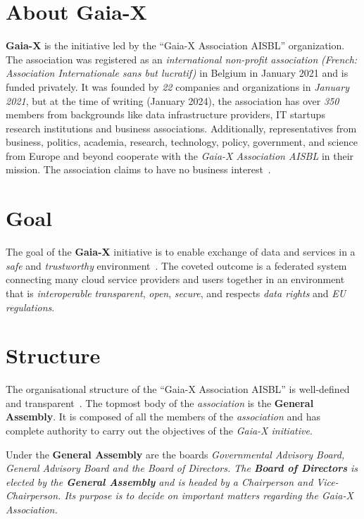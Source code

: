 \section{About Gaia-X}\label{sec:about-gaia-x}

\textbf{Gaia-X} is the initiative led by the ``Gaia-X Association AISBL'' organization.
The association was registered as an \textit{international non-profit association} \textit{(French: Association Internationale sans but lucratif)} in Belgium in January 2021 and is funded privately.
It was founded by \textit{22} companies and organizations in \textit{January 2021}, but at the time of writing (January 2024), the association has over \textit{350} members from backgrounds like data infrastructure providers, IT startups research institutions and business associations. %
Additionally, representatives from business, politics, academia, research, technology, policy, government, and science from Europe and beyond cooperate with the \textit{Gaia-X Association AISBL} in their mission.
The association claims to have no business interest~\cite{gaiax}.

\section{Goal}\label{sec:gaia-x-goal}

The goal of the \textbf{Gaia-X} initiative is to enable exchange of data and services in a \textit{safe} and \textit{trustworthy} environment~\cite{gaiax}.
The coveted outcome is a federated system connecting many cloud service providers and users together in an environment that is \textit{interoperable} \textit{transparent}, \textit{open}, \textit{secure}, and respects \textit{data rights} and \textit{EU regulations}.

\section{Structure}\label{sec:the-structure}

The organisational structure of the ``Gaia-X Association AISBL'' is well-defined and transparent~\cite{gaiax}.
The topmost body of the \textit{association} is the \textbf{General Assembly}.
It is composed of all the members of the \textit{association} and has complete authority to carry out the objectives of the \textit{Gaia-X initiative}.

Under the \textbf{General Assembly} are the boards \em \textit{Governmental Advisory Board}, \textit{General Advisory Board} and the \textit{Board of Directors}.
The \textbf{Board of Directors} is elected by the \textbf{General Assembly} and is headed by a Chairperson and Vice-Chairperson.
Its purpose is to decide on important matters regarding the \textit{Gaia-X Association}.

